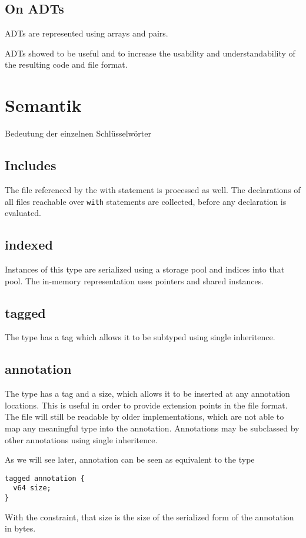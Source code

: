 \documentclass[a4paper,10pt]{article}
\begin{document}
\subsection{On ADTs}

ADTs are represented using arrays and pairs.

ADTs showed to be useful and to increase the usability and understandability of the resulting code and file format.

\section{Semantik}

Bedeutung der einzelnen Schlüsselwörter

\subsection{Includes}
The file referenced by the with statement is processed as well. The declarations of all files reachable over \texttt{with} statements are collected, before any declaration is evaluated.

\subsection{indexed}
Instances of this type are serialized using a storage pool and indices into that pool. The in-memory representation uses pointers and shared instances.

\subsection{tagged}
The type has a tag which allows it to be subtyped using single inheritence.

\subsection{annotation}
The type has a tag and a size, which allows it to be inserted at any annotation locations. This is useful in order to provide extension points in the file format. The file will still be readable by older implementations, which are not able to map any meaningful type into the annotation. Annotations may be subclassed by other annotations using single inheritence.

As we will see later, annotation can be seen as equivalent to the type
\begin{verbatim}
tagged annotation {
  v64 size;
}
\end{verbatim}
With the constraint, that size is the size of the serialized form of the annotation in bytes.
\end{document}
